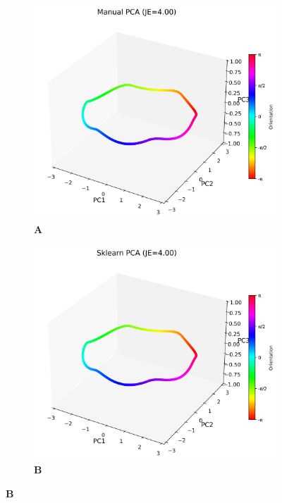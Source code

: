 \documentclass[11pt,a4paper]{article}
\begin{document}
\begin{figure}[H]
\centering
\begin{subfigure}{0.24\textwidth}
    \centering
    \caption*{\textbf{A}}
    \includegraphics[width=\textwidth]{manual_pca.png}
\end{subfigure}
\hfill
\begin{subfigure}{0.24\textwidth}
    \centering
    \caption*{\textbf{B}}
    \includegraphics[width=\textwidth]{sklearn_pca.png}

\end{subfigure}
\end{figure}
\end{document}

